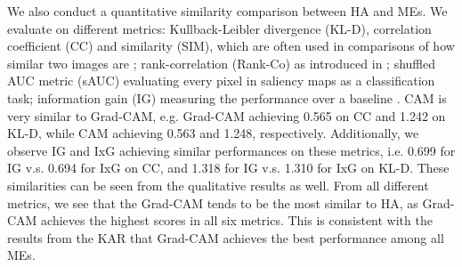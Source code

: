 \documentclass{bmvc2k}
\begin{document}
We also conduct a quantitative similarity comparison between HA and MEs. We evaluate on different metrics: Kullback-Leibler divergence (KL-D), correlation coefficient (CC) and similarity (SIM), which are often used in comparisons of how similar two images are \cite{bylinskii2018different}; rank-correlation (Rank-Co) as introduced in \cite{das2017human}; shuffled AUC metric (sAUC) evaluating every pixel in saliency maps as a classification task; information gain (IG) measuring the performance over a baseline \cite{bylinskii2018different, qiuxia2020understanding}. CAM is very similar to Grad-CAM, e.g. Grad-CAM achieving 0.565 on CC and 1.242 on KL-D, while CAM achieving 0.563 and 1.248, respectively. Additionally, we observe IG and IxG achieving similar performances on these metrics, i.e. 0.699 for IG v.s. 0.694 for IxG on CC, and 1.318 for IG v.s. 1.310 for IxG on KL-D. These similarities can be seen from the qualitative results as well. From all different metrics, we see that the Grad-CAM tends to be the most similar to HA, as Grad-CAM achieves the highest scores in all six metrics. This is consistent with the results from the KAR that Grad-CAM achieves the best performance among all MEs.

\setlength{\tabcolsep}{3pt}
\renewcommand{\arraystretch}{1.1}
\begin{table}[h]	
	\centering
    \vspace{0.4cm}
    \caption{Similarity comparison between MEs and HA saliency map. 
    (: the lower the better; : the higher the better.)
    }
    \label{tab:quantitative}
\end{table}
\end{document}
